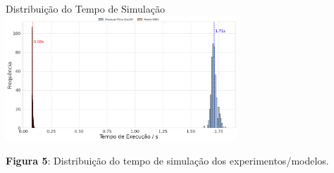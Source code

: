 \begin{frame}{Distribuição do Tempo de Simulação}
\centering
\includegraphics[width=0.65\textwidth]{figures/hist.png}

\vspace{0.3cm}
{\scriptsize \textbf{Figura 5}: Distribuição do tempo de simulação dos experimentos/modelos.}
\end{frame}




